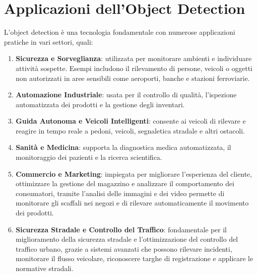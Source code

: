 \section{Applicazioni dell'Object Detection}

L'object detection è una tecnologia fondamentale con numerose applicazioni pratiche in vari settori, quali:
\begin{enumerate}
    \item \textbf{Sicurezza e Sorveglianza}: utilizzata per monitorare ambienti e individuare attività sospette. Esempi includono il rilevamento di persone, veicoli o oggetti non autorizzati in aree sensibili come aeroporti, banche e stazioni ferroviarie.
    \item \textbf{Automazione Industriale}: usata per il controllo di qualità, l'ispezione automatizzata dei prodotti e la gestione degli inventari.
    \item \textbf{Guida Autonoma e Veicoli Intelligenti}: consente ai veicoli di rilevare e reagire in tempo reale a pedoni, veicoli, segnaletica stradale e altri ostacoli.
    \item \textbf{Sanità e Medicina}: supporta la diagnostica medica automatizzata, il monitoraggio dei pazienti e la ricerca scientifica.
    \item \textbf{Commercio e Marketing}: impiegata per migliorare l'esperienza del cliente, ottimizzare la gestione del magazzino e analizzare il comportamento dei consumatori, tramite l'analisi delle immagini e dei video permette di monitorare gli scaffali nei negozi e di rilevare automaticamente il movimento dei prodotti.
    \item \textbf{Sicurezza Stradale e Controllo del Traffico}: fondamentale per il miglioramento della sicurezza stradale e l'ottimizzazione del controllo del traffico urbano, grazie a sistemi avanzati che possono rilevare incidenti, monitorare il flusso veicolare, riconoscere targhe di registrazione e applicare le normative stradali.
\end{enumerate}
